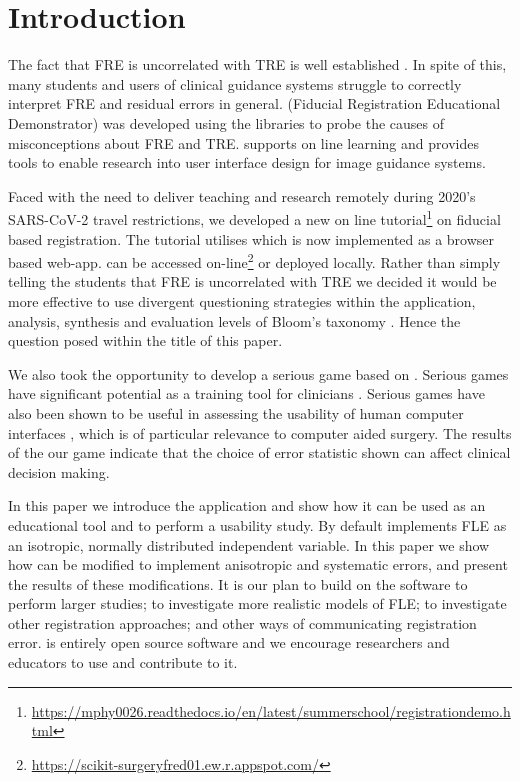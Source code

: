 \section{Introduction}
The fact that \gls{FRE} is uncorrelated with \gls{TRE} is well established 
\cite{fitzpatrick2009}. In spite of this, many students and users of clinical guidance systems struggle to 
correctly interpret \gls{FRE} and residual errors in general. 
\fred (Fiducial Registration Educational Demonstrator)
 \cite{stephen_thompson_2020_4314971} was developed using the 
\sksurgery \cite{PMID:32436132} libraries to probe the causes of misconceptions 
about \gls{FRE} and \gls{TRE}. \fred supports on line learning and provides tools to enable 
research into user interface design for image guidance systems. 

Faced with the need to deliver teaching and research remotely during 2020's {SARS-CoV-2}\cite{PMID:32123347}
travel restrictions, we 
developed a new on line tutorial\footnote{\href{https://mphy0026.readthedocs.io/en/latest/summerschool/registration_demo.html}{https://mphy0026.readthedocs.io/en/latest/summerschool/registration{\textunderscore}demo.html}}
on fiducial based registration. The tutorial utilises \fred which is now implemented as a browser based web-app. 
\fred can be accessed on-line\footnote{\href{https://scikit-surgeryfred01.ew.r.appspot.com/}{https://scikit-surgeryfred01.ew.r.appspot.com/}} or deployed locally.
Rather than simply telling the students that \gls{FRE} is uncorrelated with \gls{TRE} 
we decided it would be more effective to use divergent questioning strategies\cite{Tofade155} within the application, analysis, synthesis and 
evaluation levels of Bloom's taxonomy \cite{blooms_tax}. Hence the question posed within the title of this paper. 

We also took the opportunity to develop a serious game based on \fredns. Serious games have significant potential 
as a training tool for clinicians \cite{PMID:28133947, serious-needle}. Serious games have also been shown to be 
useful in assessing the usability of human computer interfaces \cite{hci_games}, which is of particular
relevance to computer aided surgery. The results of the our game indicate that the choice of error statistic shown can affect clinical decision making.  

In this paper we introduce the \fred application and show how it can
be used as an educational tool and to perform a usability study. By default \fred
implements \gls{FLE} as an isotropic, normally distributed independent variable. 
In this paper we show how \fred can be modified to implement anisotropic and 
systematic errors, and present the results of these modifications. 
It is our plan to build on 
the software to perform larger studies; to investigate more realistic models of \gls{FLE};
to investigate other registration approaches; and other ways of communicating registration error. 
\fred is entirely open 
source software and we encourage researchers and educators to use and contribute to it. 

